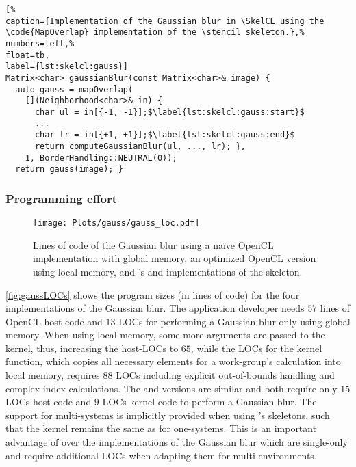 \begin{lstlisting}[%                                                             
caption={Implementation of the Gaussian blur in \SkelCL using the \code{MapOverlap} implementation of the \stencil skeleton.},%
numbers=left,%
float=tb,
label={lst:skelcl:gauss}]
Matrix<char> gaussianBlur(const Matrix<char>& image) {
  auto gauss = mapOverlap(
    [](Neighborhood<char>& in) {
      char ul = in[{-1, -1}];$\label{lst:skelcl:gauss:start}$
      ...
      char lr = in[{+1, +1}];$\label{lst:skelcl:gauss:end}$
      return computeGaussianBlur(ul, ..., lr); },
    1, BorderHandling::NEUTRAL(0));
  return gauss(image); }
\end{lstlisting}

\subsubsection*{Programming effort}

\begin{figure}[tbp]
	\centering
	\texttt{[image: Plots/gauss/gauss\_loc.pdf]}
	\caption[Lines of code of the Gaussian blur using different implementations.]%
          {Lines of code of the Gaussian blur using a na{\"i}ve OpenCL implementation with global memory, an optimized OpenCL version using local memory, and \SkelCL's  and  implementations of the \stencil skeleton.}
	\label{fig:gaussLOCs}
\end{figure} 

\autoref{fig:gaussLOCs} shows the program sizes (in lines of code) for the four implementations of the Gaussian blur. 
The application developer needs $57$ lines of OpenCL host code and 13 LOCs for performing a Gaussian blur only using global memory. 
When using local memory, some more arguments are passed to the kernel, thus, increasing the host-LOCs to $65$, while the LOCs for the kernel function, which copies all necessary elements for a work-group's calculation into local memory, requires $88$ LOCs including explicit out-of-bounds handling and complex index calculations.
The  and  versions are similar and both require only $15$ LOCs host code and $9$ LOCs kernel code to perform a Gaussian blur. 
The support for multi-\GPU systems is implicitly provided when using \SkelCL's skeletons, such that the kernel remains the same as for one-\GPU systems.
This is an important advantage of \SkelCL over the \OpenCL implementations of the Gaussian blur which are single-\GPU only and require additional LOCs when adapting them for multi-\GPU environments.

